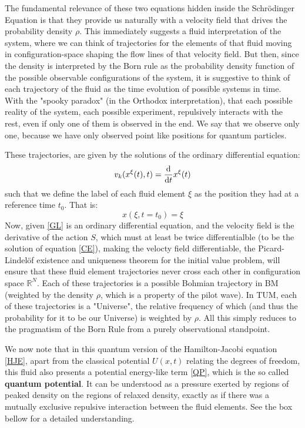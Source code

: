 \documentclass[11pt, a4paper]{article} %
\newcommand{\R}{\mathbb{R}} %
\begin{document}
The fundamental relevance of these two equations hidden inside the Schrödinger Equation is that they provide us naturally with a velocity field that drives the probability density $\rho$. This immediately suggests a fluid interpretation of the system, where we can think of trajectories for the elements of that fluid moving in configuration-space shaping the flow lines of that velocity field. But then, since the density is interpreted by the Born rule as the probability density function of the possible observable configurations of the system, it is suggestive to think of each trajectory of the fluid  as the time evolution of possible systems in time. With the "spooky paradox" (in the Orthodox interpretation), that each possible reality of the system, each possible experiment, repulsively interacts with the rest, even if only one of them is observed in the end. We say that we observe only one, because we have only observed point like positions for quantum particles.

 These trajectories, are given by the solutions of the ordinary differential equation:
\begin{equation}\label{GL}
v_k(x^\xi(t),t)=\dv{}{t}x^\xi(t)
\end{equation}
such that we define the label of each fluid element $\xi$ as the position they had at a reference time $t_0$. That is:
\begin{equation}
x(\xi,t=t_0)=\xi
\end{equation}
Now, given \eqref{GL} is an ordinary differential equation, and the velocity field is the derivative of the action $S$, which must at least be twice differentialble (to be the solution of equation \eqref{CE}), making the velocty field differentiable, the Picard-Lindelöf existence and uniqueness theorem for the initial value problem, will ensure that these fluid element trajectories never cross each other in configuration space $\R^N$. Each of these trajectories is a possible Bohmian trajectory in BM (weighted by the density $\rho$, which is a property of the pilot wave). In TUM, each of these trajectories is a "Universe", the relative frequency of which (and thus the probability for it to be our Universe) is weighted by $\rho$. All this simply reduces to the pragmatism of the Born Rule from a purely observational standpoint.

We now note that in this quantum version of the Hamilton-Jacobi equation \eqref{HJE}, apart from the classical potential $U(x,t)$ relating the degrees of freedom, this fluid also presents a potential energy-like term \eqref{QP}, which is the so called {\bf quantum potential}. It can be understood as a pressure exerted by regions of peaked density on the regions of relaxed density, exactly as if there was a mutually exclusive repulsive interaction between the fluid elements. See the box bellow for a detailed understanding.
\vspace{+0.3cm}
\end{document}

